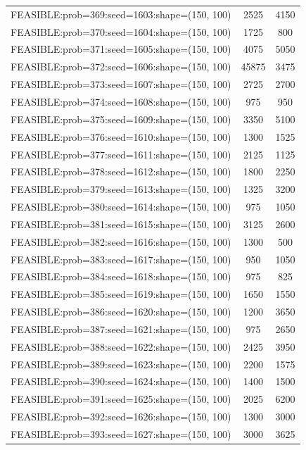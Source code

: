 \begin{longtable}{lcc}
FEASIBLE:prob=369:seed=1603:shape=(150, 100) &     2525 &  4150 \\
FEASIBLE:prob=370:seed=1604:shape=(150, 100) &     1725 &   800 \\
FEASIBLE:prob=371:seed=1605:shape=(150, 100) &     4075 &  5050 \\
FEASIBLE:prob=372:seed=1606:shape=(150, 100) &    45875 &  3475 \\
FEASIBLE:prob=373:seed=1607:shape=(150, 100) &     2725 &  2700 \\
FEASIBLE:prob=374:seed=1608:shape=(150, 100) &      975 &   950 \\
FEASIBLE:prob=375:seed=1609:shape=(150, 100) &     3350 &  5100 \\
FEASIBLE:prob=376:seed=1610:shape=(150, 100) &     1300 &  1525 \\
FEASIBLE:prob=377:seed=1611:shape=(150, 100) &     2125 &  1125 \\
FEASIBLE:prob=378:seed=1612:shape=(150, 100) &     1800 &  2250 \\
FEASIBLE:prob=379:seed=1613:shape=(150, 100) &     1325 &  3200 \\
FEASIBLE:prob=380:seed=1614:shape=(150, 100) &      975 &  1050 \\
FEASIBLE:prob=381:seed=1615:shape=(150, 100) &     3125 &  2600 \\
FEASIBLE:prob=382:seed=1616:shape=(150, 100) &     1300 &   500 \\
FEASIBLE:prob=383:seed=1617:shape=(150, 100) &      950 &  1050 \\
FEASIBLE:prob=384:seed=1618:shape=(150, 100) &      975 &   825 \\
FEASIBLE:prob=385:seed=1619:shape=(150, 100) &     1650 &  1550 \\
FEASIBLE:prob=386:seed=1620:shape=(150, 100) &     1200 &  3650 \\
FEASIBLE:prob=387:seed=1621:shape=(150, 100) &      975 &  2650 \\
FEASIBLE:prob=388:seed=1622:shape=(150, 100) &     2425 &  3950 \\
FEASIBLE:prob=389:seed=1623:shape=(150, 100) &     2200 &  1575 \\
FEASIBLE:prob=390:seed=1624:shape=(150, 100) &     1400 &  1500 \\
FEASIBLE:prob=391:seed=1625:shape=(150, 100) &     2025 &  6200 \\
FEASIBLE:prob=392:seed=1626:shape=(150, 100) &     1300 &  3000 \\
FEASIBLE:prob=393:seed=1627:shape=(150, 100) &     3000 &  3625 \\

\end{longtable}
